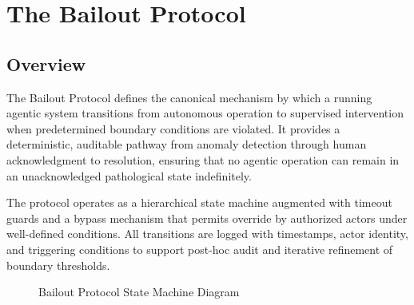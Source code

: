 \section{The Bailout Protocol}

\subsection{Overview}

The Bailout Protocol defines the canonical mechanism by which a running agentic system transitions from autonomous operation to supervised intervention when predetermined boundary conditions are violated. It provides a deterministic, auditable pathway from anomaly detection through human acknowledgment to resolution, ensuring that no agentic operation can remain in an unacknowledged pathological state indefinitely.

The protocol operates as a hierarchical state machine augmented with timeout guards and a bypass mechanism that permits override by authorized actors under well-defined conditions. All transitions are logged with timestamps, actor identity, and triggering conditions to support post-hoc audit and iterative refinement of boundary thresholds.

\begin{figure}[htbp]
\centering
{}
\caption{Bailout Protocol State Machine Diagram}
\label{fig:bailout_state_machine}
\end{figure}

